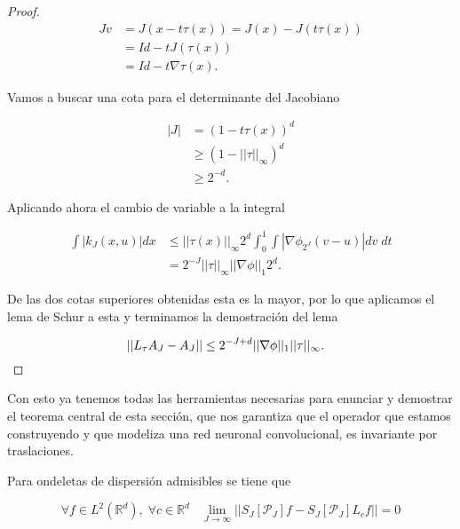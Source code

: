 \begin{proof}
  \begin{align*}
    Jv& =J(x-t\tau(x))=J(x)-J(t\tau(x)) \\
    & = Id - tJ(\tau(x)) \\
    & = Id - t\nabla \tau(x).
  \end{align*}

  \noindent Vamos a buscar una cota para el determinante del Jacobiano

  \begin{align*}
    |J| & =(1-t\tau(x))^d \\
    & \geq (1-||\tau||_\infty)^d \\
    & \geq 2^{-d}.
  \end{align*}

  \noindent Aplicando ahora el cambio de variable a la integral

  \begin{align*}
    \int |k_J(x,u)| dx &\leq ||\tau(x)||_\infty 2^d \int_0^1 \int \left| \nabla \phi_{2^J} (v-u)\right| dv \; dt \\
    &= 2^{-J} ||\tau||_\infty ||\nabla \phi ||_1 2^{d}.
  \end{align*}

  \noindent De las dos cotas superiores obtenidas esta es la mayor, por lo que aplicamos el lema de Schur a esta y terminamos la demostración del lema

  $$ ||L_{\tau} A_J - A_J || \leq 2^{-J+d} ||\nabla \phi ||_1 ||\tau||_\infty. \;\;\; \qedhere$$
\end{proof}


\noindent Con esto ya tenemos todas las herramientas necesarias para enunciar y demostrar el teorema central de esta sección, que nos garantiza que el operador que estamos construyendo y que modeliza una red neuronal convolucional, es invariante por traslaciones.

\begin{teorema} \label{invarianzaTraslaciones}
Para ondeletas de dispersión admisibles se tiene que 

$$\forall f \in L^2(\mathbb{R}^d), \; \forall c\in \mathbb{R}^d \;\;\; \lim_{J\rightarrow \infty}||S_J[\mathcal{P}_J] f-S_J[\mathcal{P}_J] L_cf||=0$$
\end{teorema}

